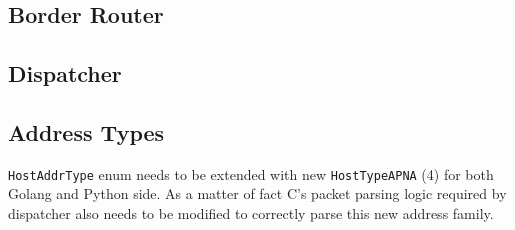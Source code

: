 \subsection{Border Router}
\subsection{Dispatcher}
\subsection{Address Types}
\texttt{HostAddrType} enum needs to be extended with new \texttt{HostTypeAPNA} (4) for both Golang and Python side. As a matter of fact C's packet parsing logic required by dispatcher also needs to be modified to correctly parse this new address family.
